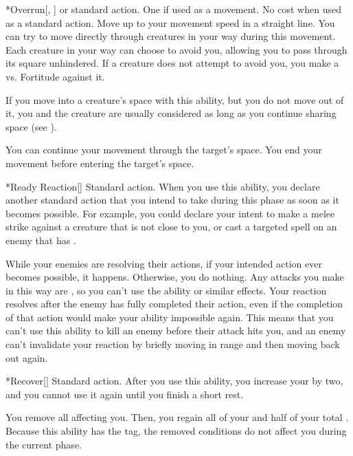     \begin{activeability}*{Overrun}[, ]
      \abilityusagetime {} or standard action.
      \abilitycost One  if used as a movement. No cost when used as a standard action.
      \rankline
      Move up to your movement speed in a straight line.
      You can try to move directly through creatures in your way during this movement.
      Each creature in your way can choose to avoid you, allowing you to pass through its square unhindered.
      If a creature does not attempt to avoid you, you make a  vs. Fortitude against it.

      If you move into a creature's space with this ability, but you do not move out of it, you and the creature are usually considered \squeezing as long as you continue sharing space (see ).

      \hit You can continue your movement through the target's space.
      \miss You end your movement before entering the target's space.
    \end{activeability}

    \begin{activeability}*{Ready Reaction}[\atSwift]
      \abilityusagetime Standard action.
      \rankline
      When you use this ability, you declare another standard action that you intend to take during this phase as soon as it becomes possible.
      For example, you could declare your intent to make a melee strike against a creature that is not close to you, or cast a targeted spell on an enemy that has .

      While your enemies are resolving their actions, if your intended action ever becomes possible, it happens.
      Otherwise, you do nothing.
      Any attacks you make in this way are , so you can't use the  ability or similar effects.
      Your reaction resolves after the enemy has fully completed their action, even if the completion of that action would make your ability impossible again.
      This means that you can't use this ability to kill an enemy before their attack hits you, and an enemy can't invalidate your reaction by briefly moving in range and then moving back out again.
    \end{activeability}

    \begin{activeability}*{Recover}[]
      \abilityusagetime Standard action.
      \rankline
      After you use this ability, you increase your  by two, and you cannot use it again until you finish a short rest.

      You remove all  affecting you.
      Then, you regain all of your  and half of your total .
      Because this ability has the  tag, the removed conditions do not affect you during the current phase.
    \end{activeability}

